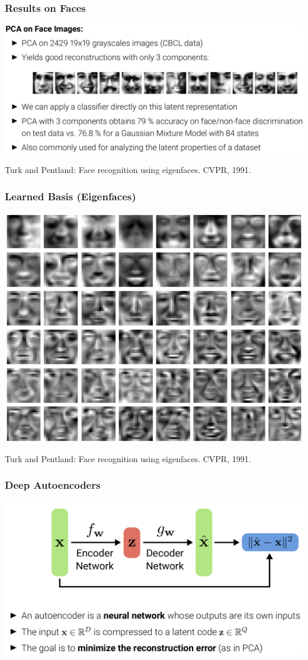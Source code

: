 \documentclass[10pt,aspectratio=169]{beamer}
\begin{document}
\begin{frame}
  \frametitle{Results on Faces}
\begin{center}
\includegraphics[width=.9\textwidth]{images/s13}
\end{center}
\scriptsize{Turk and Pentland: Face recognition using eigenfaces. CVPR, 1991.}
\end{frame}

\begin{frame}
  \frametitle{Learned Basis (Eigenfaces)}
\begin{center}
\includegraphics[width=.55\textwidth]{images/s14}
\end{center}
\scriptsize{Turk and Pentland: Face recognition using eigenfaces. CVPR, 1991.}
\end{frame}


\begin{frame}
  \frametitle{Deep Autoencoders}
\begin{center}
\includegraphics[width=.8\textwidth]{images/s15}
\end{center}
\end{frame}
\end{document}
